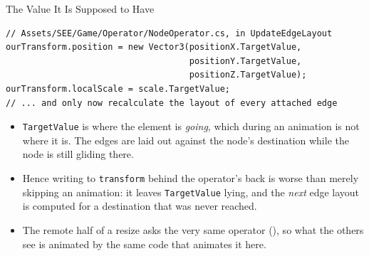 \begin{frame}[fragile]{The Value It Is Supposed to Have}
  \begin{lstlisting}[basicstyle=\scriptsize\ttfamily]
// Assets/SEE/Game/Operator/NodeOperator.cs, in UpdateEdgeLayout
ourTransform.position = new Vector3(positionX.TargetValue,
                                    positionY.TargetValue,
                                    positionZ.TargetValue);
ourTransform.localScale = scale.TargetValue;
// ... and only now recalculate the layout of every attached edge
  \end{lstlisting}
  \vspace{1ex}

  \begin{itemize}
    \item \texttt{TargetValue} is where the element is \emph{going}, which
      during an animation is not where it is. The edges are laid out against
      the node's destination while the node is still gliding there.
    \item Hence writing to \texttt{transform} behind the operator's back is
      worse than merely skipping an animation: it leaves \texttt{TargetValue}
      lying, and the \emph{next} edge layout is computed for a destination
      that was never reached.
    \item The remote half of a resize asks the very same operator
      (), so what the others see is animated by the
      same code that animates it here.
  \end{itemize}
\end{frame}

